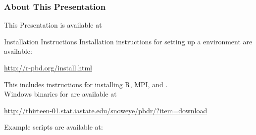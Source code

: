 \begin{frame}
  \frametitle{About This Presentation}
  \begin{block}{This Presentation is available at}
    \url{}
  \end{block}
  \begin{block}{Installation Instructions}
    Installation instructions for setting up a \pbdR environment are available:
    \begin{center}
      \url{http://r-pbd.org/install.html}
    \end{center}
    This includes instructions for installing R, MPI, and \pbdR. \\[1em]
    Windows binaries for \pbdR are available at
    \begin{center}\small
      \url{http://thirteen-01.stat.iastate.edu/snoweye/pbdr/?item=download}
    \end{center}
  \end{block}
  \begin{block}{Example scripts are available at:}
    \url{}
  \end{block}
\end{frame}





